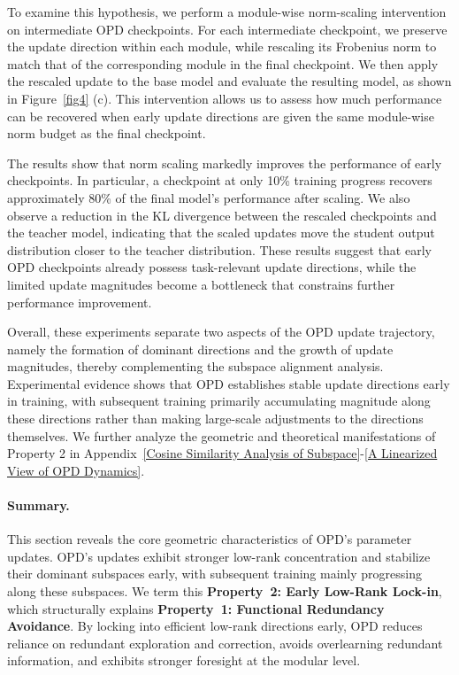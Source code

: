\documentclass{article}
\begin{document}
To examine this hypothesis, we perform a module-wise norm-scaling intervention on intermediate OPD checkpoints. For each intermediate checkpoint, we preserve the update direction within each module, while rescaling its Frobenius norm to match that of the corresponding module in the final checkpoint. We then apply the rescaled update to the base model and evaluate the resulting model, as shown in Figure~\ref{fig4} (c). This intervention allows us to assess how much performance can be recovered when early update directions are given the same module-wise norm budget as the final checkpoint.

The results show that norm scaling markedly improves the performance of early checkpoints. In particular, a checkpoint at only 10\% training progress recovers approximately 80\% of the final model's performance after scaling. We also observe a reduction in the KL divergence between the rescaled checkpoints and the teacher model, indicating that the scaled updates move the student output distribution closer to the teacher distribution. These results suggest that early OPD checkpoints already possess task-relevant update directions, while the limited update magnitudes become a bottleneck that constrains further performance improvement.

Overall, these experiments separate two aspects of the OPD update trajectory, namely the formation of dominant directions and the growth of update magnitudes, thereby complementing the subspace alignment analysis. Experimental evidence shows that OPD establishes stable update directions early in training, with subsequent training primarily accumulating magnitude along these directions rather than making large-scale adjustments to the directions themselves. We further analyze the geometric and theoretical manifestations of Property 2 in Appendix~\ref{Cosine Similarity Analysis of Subspace}-\ref{A Linearized View of OPD Dynamics}.

\paragraph{Summary.} This section reveals the core geometric characteristics of OPD's parameter updates. OPD's updates exhibit stronger low-rank concentration and stabilize their dominant subspaces early, with subsequent training mainly progressing along these subspaces. We term this \textbf{Property~2: Early Low-Rank Lock-in}, which structurally explains \textbf{Property~1: Functional Redundancy Avoidance}. By locking into efficient low-rank directions early, OPD reduces reliance on redundant exploration and correction, avoids overlearning redundant information, and exhibits stronger foresight at the modular level.
\end{document}

